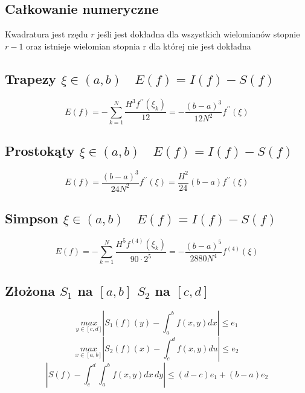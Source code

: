 \documentclass[twocolumn]{article}
\begin{document}
\begin{flushleft}
\thispagestyle{empty} %

\section{Całkowanie numeryczne}
Kwadratura jest rzędu $r$ jeśli jest dokładna dla wszystkich wielomianów stopnie $r-1$ oraz istnieje wielomian stopnia r dla której nie jest dokładna\\
\subsection{Trapezy $\xi \in \left(a,b\right) \quad E(f) = I(f) - S(f)$}
$$E(f) = -\sum_{k=1}^{N}\frac{H^3f^{\prime\prime}(\xi_k)}{12} =- \frac{(b-a)^3}{12N^2}f^{\prime\prime}(\xi)$$
\subsection{Prostokąty $\xi \in \left(a,b\right) \quad E(f) = I(f) - S(f)$}
$$E(f) = \frac{(b-a)^3}{24N^2}f^{\prime\prime}(\xi) = \frac{H^2}{24}(b-a) f^{\prime\prime}(\xi)$$
\subsection{Simpson $\xi \in \left(a,b\right) \quad E(f) = I(f) - S(f)$}
$$E(f)= -\sum_{k=1}^N \frac{H^5f^{(4)}(\xi_k)}{90\cdot2^5} =- \frac{(b-a)^5}{2880N^4}f^{(4)}(\xi) $$%
\subsection{Złożona $S_1$ na $[a,b]$ $S_2$ na $[c,d]$}
$$\underset{y\in[c,d]}{max} \left| S_1(f)(y) - \int_a^bf(x,y)dx \right| \leq e_1$$
$$\underset{x\in[a,b]}{max} \left| S_2(f)(x) - \int_c^df(x,y)du \right| \leq e_2$$
$$\left| S(f) - \int_c^d\int_a^b f(x,y) dx \,dy \right| \leq (d-c) e_1 + (b-a) e_2$$
\end{flushleft}
\thispagestyle{empty}
\end{document}
